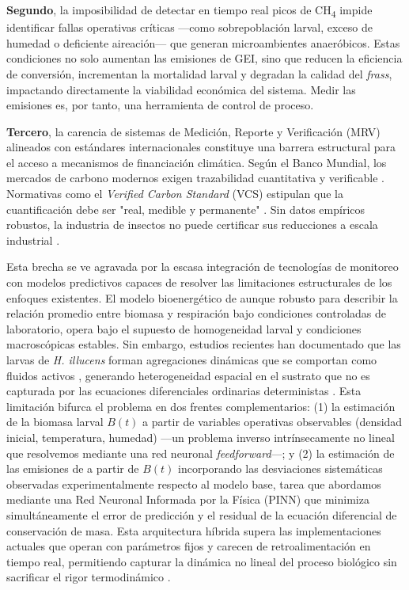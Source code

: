 \textbf{Segundo}, la imposibilidad de detectar en tiempo real picos de CH\textsubscript{4} impide identificar fallas operativas críticas —como sobrepoblación larval, exceso de humedad o deficiente aireación— que generan microambientes anaeróbicos. Estas condiciones no solo aumentan las emisiones de GEI, sino que reducen la eficiencia de conversión, incrementan la mortalidad larval y degradan la calidad del \textit{frass}, impactando directamente la viabilidad económica del sistema. Medir las emisiones es, por tanto, una herramienta de control de proceso.

\textbf{Tercero}, la carencia de sistemas de Medición, Reporte y Verificación (MRV) alineados con estándares internacionales constituye una barrera estructural para el acceso a mecanismos de financiación climática. Según el Banco Mundial, los mercados de carbono modernos exigen trazabilidad cuantitativa y verificable \parencite{worldbankStateTrendsCarbon2023}. Normativas como el \textit{Verified Carbon Standard} (VCS) estipulan que la cuantificación debe ser "real, medible y permanente" \parencite{VCSStandardv47FINAL41524}. Sin datos empíricos robustos, la industria de insectos no puede certificar sus reducciones a escala industrial \parencite{smetanaSustainableUseHermetia2019a}.

Esta brecha se ve agravada por la escasa integración de tecnologías de monitoreo con modelos predictivos capaces de resolver las limitaciones estructurales de los enfoques existentes. El modelo bioenergético de \textcite{eriksenDynamicModellingFeed2022} aunque robusto para describir la relación promedio entre biomasa y respiración bajo condiciones controladas de laboratorio, opera bajo el supuesto de homogeneidad larval y condiciones macroscópicas estables. Sin embargo, estudios recientes han documentado que las larvas de \textit{H. illucens} forman agregaciones dinámicas que se comportan como fluidos activos \parencite{koAirFluidizedAggregatesBlack2021}, generando heterogeneidad espacial en el sustrato que no es capturada por las ecuaciones diferenciales ordinarias deterministas \parencite{tomberlinBugBookBlackSoldier2025}. Esta limitación bifurca el problema en dos frentes complementarios: (1) la estimación de la biomasa larval $B(t)$ a partir de variables operativas observables (densidad inicial, temperatura, humedad) ---un problema inverso intrínsecamente no lineal que resolvemos mediante una red neuronal \textit{feedforward}---; y (2) la estimación de las emisiones de  a partir de $B(t)$ incorporando las desviaciones sistemáticas observadas experimentalmente respecto al modelo base, tarea que abordamos mediante una Red Neuronal Informada por la Física (PINN) que minimiza simultáneamente el error de predicción y el residual de la ecuación diferencial de conservación de masa. Esta arquitectura híbrida supera las implementaciones actuales que operan con parámetros fijos y carecen de retroalimentación en tiempo real, permitiendo capturar la dinámica no lineal del proceso biológico sin sacrificar el rigor termodinámico \parencite{kamilarisReviewPracticeBig2017,liuOptimizingDataPipelines2023a}.

